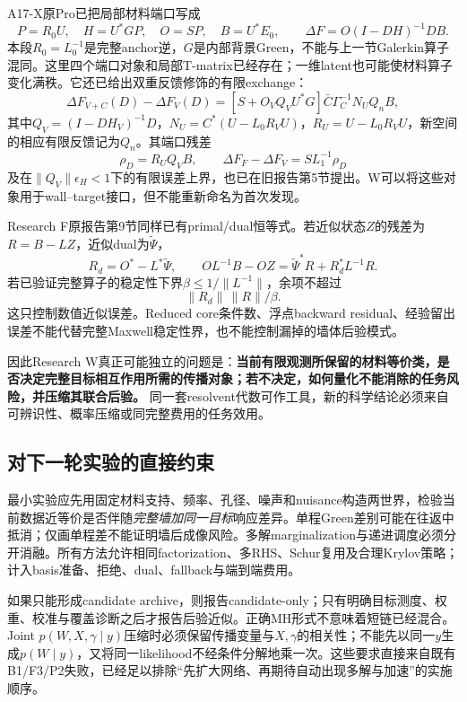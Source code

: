 A17-X原Pro已把局部材料端口写成
\[
P=R_0U,\quad H=U^*GP,\quad O=SP,\quad B=U^*E_0,\qquad
\Delta F=O(I-DH)^{-1}DB.
\]
本段\(R_0=L_0^{-1}\)是完整anchor逆，\(G\)是内部背景Green，不能与上一节Galerkin算子混同。这里四个端口对象和局部T-matrix已经存在；一维latent也可能使材料算子变化满秩。它还已给出双重反馈修饰的有限exchange：
\[
\Delta F_{V+C}(D)-\Delta F_V(D)
=[S+O_VQ_VU^*G]\bar C\Gamma_C^{-1}N_UQ_nB,
\]
其中\(Q_V=(I-DH_V)^{-1}D\)，\(N_U=C^*(U-L_0R_VU)\)，\(R_U=U-L_0R_VU\)，新空间的相应有限反馈记为\(Q_n\)。其端口残差
\[
\rho_D=R_UQ_VB,\qquad
\Delta F_F-\Delta F_V=SL_1^{-1}\rho_D
\]
及在\(\|Q_V\|\epsilon_H<1\)下的有限误差上界，也已在旧报告第5节提出。W可以将这些对象用于wall--target接口，但不能重新命名为首次发现。\cite{R_A17X}

Research F原报告第9节同样已有primal/dual恒等式。若近似状态\(Z\)的残差为\(R=B-LZ\)，近似dual为\(\widetilde\Psi\)，
\[
R_d=O^*-L^*\widetilde\Psi,\qquad
OL^{-1}B-OZ
=\widetilde\Psi^*R+R_d^*L^{-1}R.
\]
若已验证完整算子的稳定性下界\(\beta\leq1/\|L^{-1}\|\)，余项不超过
\[
\|R_d\|\,\|R\|/\beta.
\]
这只控制数值近似误差。Reduced core条件数、浮点backward residual、经验留出误差不能代替完整Maxwell稳定性界，也不能控制漏掉的墙体后验模式。\cite{R_F}

因此Research W真正可能独立的问题是：\textbf{当前有限观测所保留的材料等价类，是否决定完整目标相互作用所需的传播对象；若不决定，如何量化不能消除的任务风险，并压缩其联合后验。} 同一套resolvent代数可作工具，新的科学结论必须来自可辨识性、概率压缩或同完整费用的任务效用。

\subsection{对下一轮实验的直接约束}

最小实验应先用固定材料支持、频率、孔径、噪声和nuisance构造两世界，检验当前数据近等价是否伴随\emph{完整墙加同一目标}响应差异。单程Green差别可能在往返中抵消；仅画单程差不能证明墙后成像风险。多解marginalization与递进调度必须分开消融。所有方法允许相同factorization、多RHS、Schur复用及合理Krylov策略；计入basis准备、拒绝、dual、fallback与端到端费用。

如果只能形成candidate archive，则报告candidate-only；只有明确目标测度、权重、校准与覆盖诊断之后才报告后验近似。正确MH形式不意味着短链已经混合。Joint \(p(W,X,\gamma\mid y)\)压缩时必须保留传播变量与\(X,\gamma\)的相关性；不能先以同一\(y\)生成\(p(W\mid y)\)，又将同一likelihood不经条件分解地乘一次。这些要求直接来自既有B1/F3/P2失败，已经足以排除“先扩大网络、再期待自动出现多解与加速”的实施顺序。\cite{R_B1,R_F3,R_P2}

